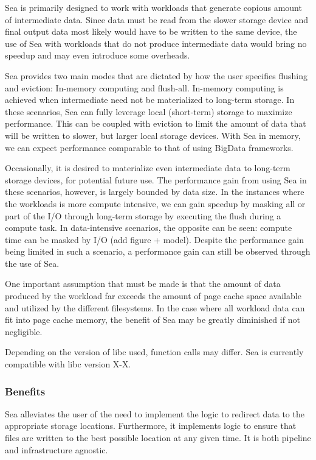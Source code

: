 Sea is primarily designed to work with workloads that generate copious amount of intermediate data.
Since data must be read from the slower storage device and final output data most likely would have to
be written to the same device, the use of Sea with workloads that do not produce intermediate data would
bring no speedup and may even introduce some overheads. 

Sea provides two main modes that are dictated by how the user specifies flushing and eviction: In-memory computing and flush-all.
In-memory computing is achieved when intermediate need not be materialized to long-term storage. In these scenarios, Sea can fully
leverage local (short-term) storage to maximize performance. This can be coupled with eviction to limit the amount of
data that will be written to slower, but larger local storage devices. With Sea in memory, we can expect performance comparable to
that of using BigData frameworks.

Occasionally, it is desired to materialize even intermediate data to long-term storage devices, for potential future use. The
performance gain from using Sea in these scenarios, however, is largely bounded by data size. In the instances where the workloads is more compute intensive,
we can gain speedup by masking all or part of the I/O through long-term storage by executing the flush during a compute task. In data-intensive scenarios, the 
opposite can be seen: compute time can be masked by I/O (add figure + model). Despite the performance gain being limited in
such a scenario, a performance gain can still be observed through the use of Sea.

One important assumption that must be made is that the amount of data produced by the workload far exceeds the amount of page cache space available and utilized
by the different filesystems. In the case where all workload data can fit into page cache memory, the benefit of Sea may be
greatly diminished if not negligible.

Depending on the version of libc used, function calls may differ. Sea is currently compatible with libc version X-X.


\subsubsection{Benefits}
Sea alleviates the user of the need to implement the logic to redirect data to the appropriate
storage locations. Furthermore, it implements logic to ensure that files are written to the best possible
location at any given time. It is both pipeline and infrastructure agnostic. 

